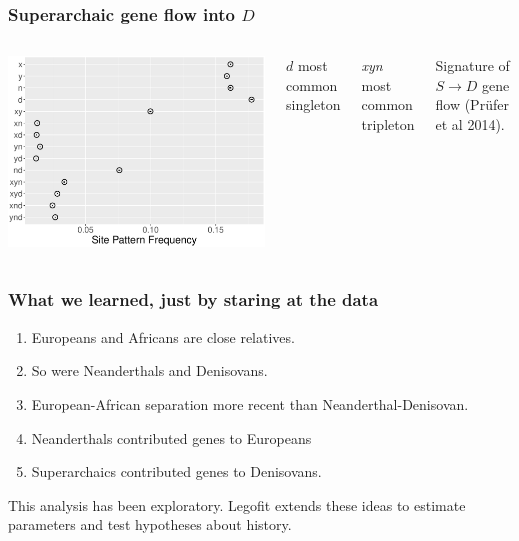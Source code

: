 \documentclass[pdftex,12pt]{beamer}
\begin{document}
\begin{frame}
  \frametitle{Superarchaic gene flow into $D$}
  \begin{columns}
    \includegraphics[width=\linewidth]{xynd-frq.pdf}
      \raggedleft

      $d$ most common singleton

      \bigskip

      \textit{xyn} most common tripleton

      \bigskip

      Signature of $S \rightarrow D$ gene flow (Pr{\"u}fer et al 2014).
  \end{columns}
\end{frame}

\begin{frame}
  \frametitle{What we learned, just by staring at the data}
  \begin{enumerate}
    \item Europeans and Africans are close relatives.
    \item So were Neanderthals and Denisovans.
    \item European-African separation more recent than
      Neanderthal-Denisovan.
    \item Neanderthals contributed genes to Europeans
    \item Superarchaics contributed genes to Denisovans.
  \end{enumerate}

  \bigskip
  
This analysis has been exploratory. Legofit extends these ideas to
estimate parameters and test hypotheses about history.
\end{frame}  
\end{document}
